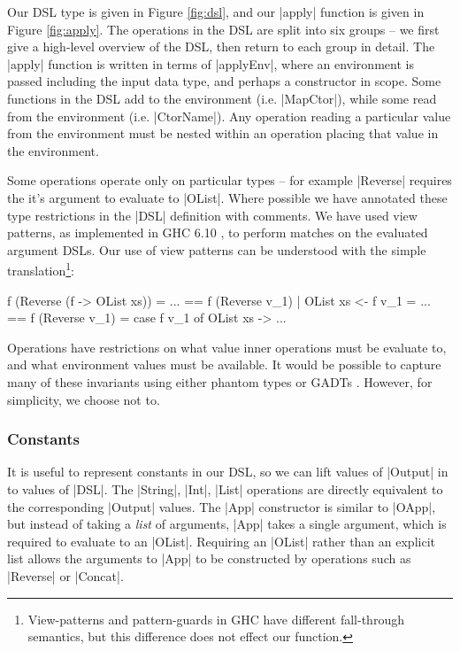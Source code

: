 \documentclass[preprint,draft]{sigplanconf}
\begin{document}
Our DSL type is given in Figure \ref{fig:dsl}, and our |apply| function is given in Figure \ref{fig:apply}. The operations in the DSL are split into six groups -- we first give a high-level overview of the DSL, then return to each group in detail. The |apply| function is written in terms of |applyEnv|, where an environment is passed including the input data type, and perhaps a constructor in scope. Some functions in the DSL add to the environment (i.e. |MapCtor|), while some read from the environment (i.e. |CtorName|). Any operation reading a particular value from the environment must be nested within an operation placing that value in the environment.

Some operations operate only on particular types -- for example |Reverse| requires the it's argument to evaluate to |OList|. Where possible we have annotated these type restrictions in the |DSL| definition with comments. We have used view patterns, as implemented in GHC 6.10 \cite{ghc_610}, to perform matches on the evaluated argument DSLs. Our use of view patterns can be understood with the simple translation\footnote{View-patterns and pattern-guards in GHC have different fall-through semantics, but this difference does not effect our function.}:

\ignore\begin{code}
f (Reverse (f -> OList xs)) = ...
    ==
f (Reverse v_1) | OList xs <- f v_1 = ...
    ==
f (Reverse v_1) = case f v_1 of OList xs -> ...
\end{code}

Operations have restrictions on what value inner operations must be evaluate to, and what environment values must be available. It would be possible to capture many of these invariants using either phantom types \cite{phantom_types} or GADTs \cite{spj:gadt}. However, for simplicity, we choose not to.

\subsubsection{Constants}

It is useful to represent constants in our DSL, so we can lift values of |Output| in to values of |DSL|. The |String|, |Int|, |List| operations are directly equivalent to the corresponding |Output| values. The |App| constructor is similar to |OApp|, but instead of taking a \textit{list} of arguments, |App| takes a single argument, which is required to evaluate to an |OList|. Requiring an |OList| rather than an explicit list allows the arguments to |App| to be constructed by operations such as |Reverse| or |Concat|.
\end{document}
